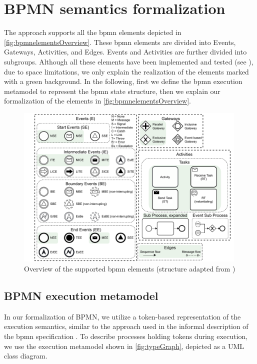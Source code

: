 \documentclass[runningheads]{llncs}
\begin{document}
\section{BPMN semantics formalization} \label{sec:formalization}

The approach supports all the \gls*{bpmn} elements depicted in \autoref{fig:bpmnelementsOverview}.
These \gls*{bpmn} elements are divided into \textsf{Events}, \textsf{Gateways}, \textsf{Activities}, and \textsf{Edges}.
\textsf{Events} and \textsf{Activities} are further divided into subgroups.
Although all these elements have been implemented and tested (see \cite{krauterArtifactsICGT2023}), due to space limitations, we only explain the realization of the elements marked with a green background.
In the following, first we define the \gls*{bpmn} execution metamodel to represent the \gls*{bpmn} state structure, then we explain our formalization of the elements in \autoref{fig:bpmnelementsOverview}.


\begin{figure}[ht]
    \centering
    \includegraphics[width=0.99\textwidth]{images/bpmn_semantics-element-overview.pdf}
    \caption{Overview of the supported \gls*{bpmn} elements (structure adapted from \cite{houhouFirstOrderLogicVerification2022})}
    \label{fig:bpmnelementsOverview}
\end{figure}


\subsection{BPMN execution metamodel}

In our formalization of BPMN, we utilize a token-based representation of the execution semantics, similar to the approach used in the informal description of the \gls*{bpmn} specification \cite{objectmanagementgroupBusinessProcessModel2013}.
To describe processes holding tokens during execution, we use the execution metamodel shown in \autoref{fig:typeGraph}, depicted as a UML class diagram.
\end{document}
